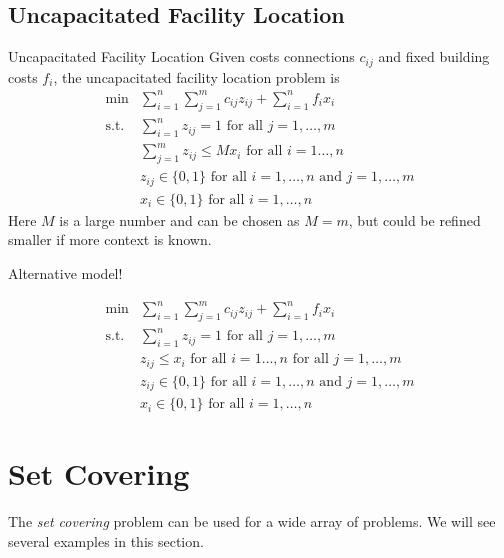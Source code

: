 \subsection{Uncapacitated Facility Location}
\begin{general}{Uncapacitated Facility Location}{\npcomplete}
Given costs connections $c_{ij}$ and fixed building costs $f_i$, the uncapacitated facility location problem is 
\begin{equation}
\begin{array}{rl}
\min & \displaystyle\sum_{i=1}^n\sum_{j=1}^mc_{ij}z_{ij}+\sum_{i=1}^nf_ix_i \\
\text{s.t.} & \displaystyle\sum_{i=1}^nz_{ij}=1 \text{ for all }j=1,\dots,m \\
& \displaystyle \sum_{j=1}^mz_{ij}\leqslant Mx_i\text{ for all }i=1\dots,n \\
&z_{ij}\in\{0,1\}\text{ for all }i=1,\dots,n \text{ and }j=1,\dots,m\\
&x_i\in\{0,1\}\text{ for all } i=1,\dots,n
\end{array}
\end{equation}
Here $M$ is a large number and can be chosen as $M = m$, but could be refined smaller if more context is known.
\end{general}

Alternative model!

\begin{equation}
\begin{array}{rl}
\min & \displaystyle\sum_{i=1}^n\sum_{j=1}^mc_{ij}z_{ij}+\sum_{i=1}^nf_ix_i \\
\text{s.t.} & \displaystyle\sum_{i=1}^nz_{ij}=1 \text{ for all }j=1,\dots,m \\
& z_{ij}\leqslant x_i\text{ for all }i=1\dots,n \text{ for all } j = 1, \dots, m \\
&z_{ij}\in\{0,1\}\text{ for all }i=1,\dots,n \text{ and }j=1,\dots,m\\
&x_i\in\{0,1\}\text{ for all } i=1,\dots,n
\end{array}
\end{equation}
\newpage



\section{Set Covering}
\todoSection{}

The \emph{set covering} problem can be used for a wide array of problems.    We will see several examples in this section.

